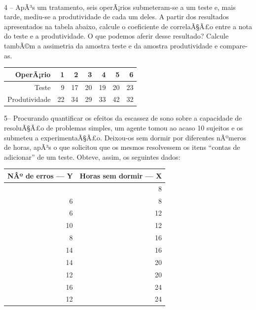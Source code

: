 ﻿\documentclass[11pt]{article}
\begin{document}
    \begin{center}
    \end{center}
    { \hspace*{\fill} \\}
    
    4 -- ApÃ³s um tratamento, seis operÃ¡rios submeteram-se a um teste e, mais
tarde, mediu-se a produtividade de cada um deles. A partir dos
resultados apresentados na tabela abaixo, calcule o coeficiente de
correlaÃ§Ã£o entre a nota do teste e a produtividade. O que podemos aferir
desse resultado? Calcule tambÃ©m a assimetria da amostra teste e da
amostra produtividade e compare-as.

{\def\LTcaptype{table} %
\begin{longtable}[]{@{}rrrrrrr@{}}
\toprule\noalign{}
OperÃ¡rio & 1 & 2 & 3 & 4 & 5 & 6 \\
\midrule\noalign{}
\endhead
\bottomrule\noalign{}
\endlastfoot
Teste & 9 & 17 & 20 & 19 & 20 & 23 \\
Produtividade & 22 & 34 & 29 & 33 & 42 & 32 \\
\end{longtable}
}

    5-- Procurando quantificar os efeitos da escassez de sono sobre a
capacidade de resoluÃ§Ã£o de problemas simples, um agente tomou ao acaso
10 sujeitos e os submeteu a experimentaÃ§Ã£o. Deixou-os sem dormir por
diferentes nÃºmeros de horas, apÃ³s o que solicitou que os mesmos
resolvessem os itens ``contas de adicionar'' de um teste. Obteve, assim,
os seguintes dados:

{\def\LTcaptype{table} %
\begin{longtable}[]{@{}rr@{}}
\toprule\noalign{}
NÂº de erros --- Y & Horas sem dormir --- X \\
\midrule\noalign{}
\endhead
\bottomrule\noalign{}
\endlastfoot
8 & 8 \\
6 & 8 \\
6 & 12 \\
10 & 12 \\
8 & 16 \\
14 & 16 \\
14 & 20 \\
12 & 20 \\
16 & 24 \\
12 & 24 \\
\end{longtable}
}
\end{document}
